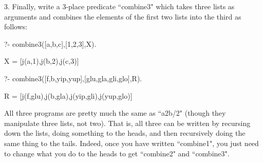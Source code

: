 3. Finally, write a 3-place predicate ``combine3" which takes
three lists as arguments and combines the elements of the first two lists
into the third as follows:
\begin{LPNcodedisplay}
?- combine3([a,b,c],[1,2,3],X).

X = [j(a,1),j(b,2),j(c,3)]

?- combine3([f,b,yip,yup],[glu,gla,gli,glo],R).

R = [j(f,glu),j(b,gla),j(yip,gli),j(yup,glo)]
\end{LPNcodedisplay}


All three programs are pretty much the same as ``a2b/2" (though they
manipulate three lists, not two).  That is, all three can be written
by recursing down the lists, doing something to the heads, and then
recursively doing the same thing to the tails.  Indeed, once you have
written ``combine1", you just need to change what you do to the heads
to get ``combine2" and ``combine3".

